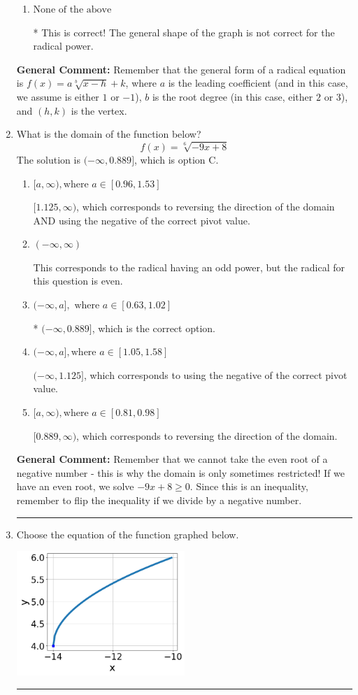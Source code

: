 \documentclass{extbook}[14pt]
\newcommand{\litem}[1]{\item #1

\rule{\textwidth}{0.4pt}}
\begin{document}
\begin{enumerate}
{\begin{enumerate}[label=\Alph*.]
This corresponds to switching the coefficient and having the correct vertex with the root degree as $3$.
\item \( \text{None of the above} \)

* This is correct! The general shape of the graph is not correct for the radical power.
\end{enumerate}

\textbf{General Comment:} Remember that the general form of a radical equation is $ f(x) = a \sqrt[b]{x - h} + k$, where $a$ is the leading coefficient (and in this case, we assume is either $1$ or $-1$), $b$ is the root degree (in this case, either $2$ or $3$), and $(h, k)$ is the vertex.
}
\litem{
What is the domain of the function below?
\[ f(x) = \sqrt[6]{-9 x + 8} \]The solution is \( (-\infty, 0.889] \), which is option C.\begin{enumerate}[label=\Alph*.]
\item \( [a, \infty), \text{where } a \in [0.96, 1.53] \)

$[1.125, \infty)$, which corresponds to reversing the direction of the domain AND using the negative of the correct pivot value.
\item \( (-\infty, \infty) \)

This corresponds to the radical having an odd power, but the radical for this question is even.
\item \( (-\infty, a], \text{ where } a \in [0.63, 1.02] \)

* $(-\infty, 0.889]$, which is the correct option.
\item \( (-\infty, a], \text{where } a \in [1.05, 1.58] \)

$(-\infty, 1.125]$, which corresponds to using the negative of the correct pivot value.
\item \( [a, \infty), \text{where } a \in [0.81, 0.98] \)

 $[0.889, \infty)$, which corresponds to reversing the direction of the domain.
\end{enumerate}

\textbf{General Comment:} Remember that we cannot take the even root of a negative number - this is why the domain is only sometimes restricted! If we have an even root, we solve $-9 x + 8 \geq 0$. Since this is an inequality, remember to flip the inequality if we divide by a negative number.
}
\litem{
Choose the equation of the function graphed below.

\begin{center}
    \includegraphics[width=0.5\textwidth]{../Figures/radicalGraphToEquationC.png}
\end{center}


}
\end{enumerate}
\end{document}
